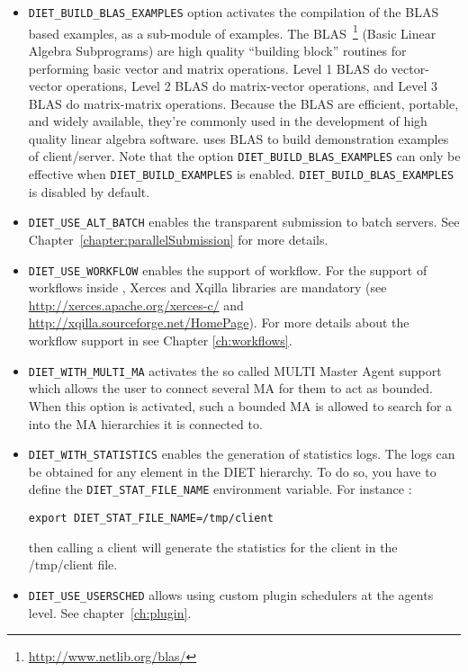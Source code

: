 \begin{itemize}
\item
  \verb+DIET_BUILD_BLAS_EXAMPLES+ option activates the compilation of
  the BLAS based \diet examples, as a sub-module of examples.  The
  BLAS~\footnote{\url{http://www.netlib.org/blas/}} (Basic Linear
  Algebra Subprograms) are high quality ``building block'' routines
  for performing basic vector and matrix operations.  Level 1 BLAS do
  vector-vector operations, Level 2 BLAS do matrix-vector operations,
  and Level 3 BLAS do matrix-matrix operations.  Because the BLAS are
  efficient, portable, and widely available, they're commonly used in
  the development of high quality linear algebra software. \diet uses
  BLAS to build demonstration examples of client/server.  Note that
  the option \verb+DIET_BUILD_BLAS_EXAMPLES+ can only be effective
  when \verb+DIET_BUILD_EXAMPLES+ is enabled.
  \verb+DIET_BUILD_BLAS_EXAMPLES+ is disabled by default.

\item
  \verb+DIET_USE_ALT_BATCH+ enables the transparent submission to
  batch servers. See Chapter~\ref{chapter:parallelSubmission} for more
  details.

\item
  \verb+DIET_USE_WORKFLOW+ enables the support of workflow. For the support
  of workflows inside \diet, Xerces and Xqilla libraries are mandatory 
  (see \url{http://xerces.apache.org/xerces-c/} and
  \url{http://xqilla.sourceforge.net/HomePage}). For more details about the
  workflow support in \diet see Chapter \ref{ch:workflows}.

\item
  \label{sec:multimainstall}
  \verb+DIET_WITH_MULTI_MA+ activates the so called MULTI Master Agent
  support which allows the user to connect several MA for them to act
  as bounded.
  When this option is activated, such a bounded MA is allowed to search
  for a \sed into the MA hierarchies it is connected to.

\item
  \verb+DIET_WITH_STATISTICS+ enables the generation of statistics logs.
  The logs can be obtained for any element in the DIET hierarchy. To do
  so, you have to define the \texttt{DIET\_STAT\_FILE\-\_NAME} environment variable.
  For instance : \\
\centerline{\texttt{export DIET\_STAT\_FILE\_NAME=/tmp/client}}
then calling
  a client will generate the statistics for the client in the /tmp/client
  file.

\item
  \verb+DIET_USE_USERSCHED+ allows using custom plugin schedulers at the \diet
  agents level. See chapter~\ref{ch:plugin}.


\end{itemize}
